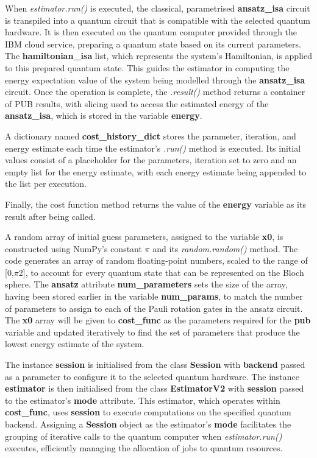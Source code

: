 \documentclass{article}
\begin{document}
{When \textit{estimator.run()} is executed, the classical, parametrised \textbf{ansatz\_isa} circuit is transpiled into a quantum circuit that is compatible with the selected quantum hardware. It is then executed on the quantum computer provided through the IBM cloud service, preparing a quantum state based on its current parameters\cite{EstimatorV2}\cite{Tutorial}. The \textbf{hamiltonian\_isa} list, which represents the system's Hamiltonian, is applied to this prepared quantum state. This guides the estimator in computing the energy expectation value of the system being modelled through the \textbf{ansatz\_isa} circuit. Once the operation is complete, the \textit{.result()} method returns a container of PUB results\cite{PrimitiveResult}, with slicing used to access the estimated energy of the \textbf{ansatz\_isa}, which is stored in the variable \textbf{energy}.

A dictionary named \textbf{cost\_history\_dict} stores the parameter, iteration, and energy estimate each time the estimator's \textit{.run()} method is executed. Its initial values consist of a placeholder for the parameters, iteration set to zero and an empty list for the energy estimate, with each energy estimate being appended to the list per execution. 

Finally, the cost function method returns the value of the \textbf{energy} variable as its result after being called.

A random array of initial guess parameters, assigned to the variable \textbf{x0}, is constructed using NumPy’s constant $\pi$ and its \textit{random.random()} method. The code generates an array of random floating-point numbers, scaled to the range of [0,$\pi$2], to account for every quantum state that can be represented on the Bloch sphere. The \textbf{ansatz} attribute \textbf{num\_parameters} sets the size of the array, having been stored earlier in the variable \textbf{num\_params}, to match the number of parameters to assign to each of the Pauli rotation gates in the ansatz circuit. The \textbf{x0} array will be given to \textbf{cost\_func} as the parameters required for the \textbf{pub} variable and updated iteratively to find the set of parameters that produce the lowest energy estimate of the system.

The instance \textbf{session} is initialised from the class \textbf{Session} with \textbf{backend} passed as a parameter to configure it to the selected quantum hardware. The instance \textbf{estimator} is then initialised from the class \textbf{EstimatorV2} with \textbf{session} passed to the estimator's \textbf{mode} attribute. This estimator, which operates within \textbf{cost\_func}, uses \textbf{session} to execute computations on the specified quantum backend. Assigning a  \textbf{Session} object as the estimator's \textbf{mode} facilitates the grouping of iterative calls to the quantum computer\cite{Session} when \textit{estimator.run()} executes, efficiently managing the allocation of jobs to quantum resources.

}
\end{document}

